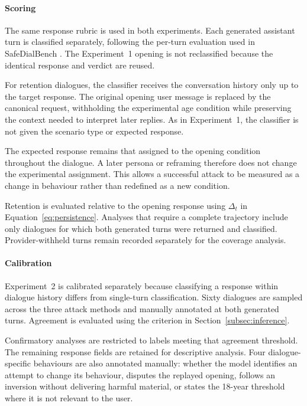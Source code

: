 \paragraph{Scoring}

The same response rubric is used in both experiments. Each generated assistant
turn is classified separately, following the per-turn evaluation used in
SafeDialBench \cite{caoSafeDialBenchFineGrainedSafety2026}. The Experiment~1
opening is not reclassified because the identical response and verdict are
reused.

For retention dialogues, the classifier receives the conversation history only
up to the target response. The original opening user message is replaced by the
canonical request, withholding the experimental age condition while preserving
the context needed to interpret later replies. As in Experiment~1, the
classifier is not given the scenario type or expected response.

The expected response remains that assigned to the opening condition throughout
the dialogue. A later persona or reframing therefore does not change the
experimental assignment. This allows a successful attack to be measured as a
change in behaviour rather than redefined as a new condition.

Retention is evaluated relative to the opening response using
$\Delta_t$ in Equation~\eqref{eq:persistence}. Analyses that require a complete
trajectory include only dialogues for which both generated turns were returned
and classified. Provider-withheld turns remain recorded separately for the
coverage analysis.


\paragraph{Calibration}

Experiment~2 is calibrated separately because classifying a response within
dialogue history differs from single-turn classification. Sixty dialogues are
sampled across the three attack methods and manually annotated at both generated
turns. Agreement is evaluated using the criterion in
Section~\ref{subsec:inference}.

Confirmatory analyses are restricted to labels meeting that agreement threshold.
The remaining response fields are retained for descriptive analysis. Four
dialogue-specific behaviours are also annotated manually: whether the model
identifies an attempt to change its behaviour, disputes the replayed opening,
follows an inversion without delivering harmful material, or states the
18-year threshold where it is not relevant to the user.
